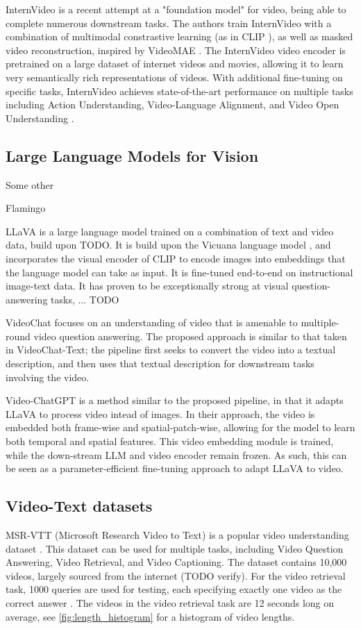 \documentclass{article}
\begin{document}
InternVideo is a recent attempt at a "foundation model" for video, being able to complete numerous downstream tasks.
The authors train InternVideo with a combination of multimodal constrastive learning (as in CLIP \cite{clip}), as well as masked video reconstruction, inspired by VideoMAE \cite{videomae}.
The InternVideo video encoder is pretrained on a large dataset of internet videos and movies, allowing it to learn very semantically rich representations of videos.
With additional fine-tuning on specific tasks, InternVideo achieves state-of-the-art performance on multiple tasks including Action Understanding, Video-Language Alignment, and Video Open Understanding \cite{internvideo}.

\subsection{Large Language Models for Vision}

Some other 

Flamingo

LLaVA \cite{llava} is a large language model trained on a combination of text and video data, build upon TODO. 
It is build upon the Vicuana language model \cite{vicuana}, and incorporates the visual encoder of CLIP \cite{clip} to encode images into embeddings that the language model can take as input.
It is fine-tuned end-to-end on instructional image-text data.
It has proven to be exceptionally strong at visual question-answering tasks, ... TODO

VideoChat \cite{videochat} focuses on an understanding of video that is amenable to multiple-round video question answering.
The proposed approach is similar to that taken in VideoChat-Text; the pipeline first seeks to convert the video into a textual description, and then uses that textual description for downstream tasks involving the video.

Video-ChatGPT \cite{videochatgpt} is a method similar to the proposed pipeline, in that it adapts LLaVA to process video intead of images.
In their approach, the video is embedded both frame-wise and spatial-patch-wise, allowing for the model to learn both temporal and spatial features.
This video embedding module is trained, while the down-stream LLM and video encoder remain frozen. As such, this can be seen as a parameter-efficient fine-tuning approach to adapt LLaVA to video.




\subsection{Video-Text datasets}
MSR-VTT (Microsoft Research Video to Text) is a popular video understanding dataset \cite{msr-vtt}.
This dataset can be used for multiple tasks, including Video Question Answering, Video Retrieval, and Video Captioning.
The dataset contains 10,000 videos, largely sourced from the internet (TODO verify).
For the video retrieval task, 1000 queries are used for testing, each specifying exactly one video as the correct answer \cite{jsfusion}.
The videos in the video retrieval task are 12 seconds long on average, see \ref{fig:length_histogram} for a histogram of video lengths.
\end{document}
